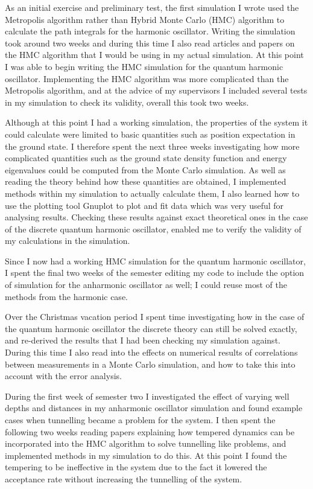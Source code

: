 \documentclass[12pt]{article}
\begin{document}
    As an initial exercise and preliminary test, the first simulation I wrote used the Metropolis algorithm rather than Hybrid Monte Carlo (HMC) algorithm to calculate the path integrals for the harmonic oscillator. Writing the simulation took around two weeks and during this time I also read articles and papers on the HMC algorithm that I would be using in my actual simulation. At this point I was able to begin writing the HMC simulation for the quantum harmonic oscillator. Implementing the HMC algorithm was more complicated than the Metropolis algorithm, and at the advice of my supervisors I included several tests in my simulation to check its validity, overall this took two weeks. 

    Although at this point I had a working simulation, the properties of the system it could calculate were limited to basic quantities such as position expectation in the ground state. I therefore spent the next three weeks investigating how more complicated quantities such as the ground state density function and energy eigenvalues could be computed from the Monte Carlo simulation. As well as reading the theory behind how these quantities are obtained, I implemented methods within my simulation to actually calculate them, I also learned how to use the plotting tool Gnuplot to plot and fit data which was very useful for analysing results. Checking these results against exact theoretical ones in the case of the discrete quantum harmonic oscillator, enabled me to verify the validity of my calculations in the simulation. 

    Since I now had a working HMC simulation for the quantum harmonic oscillator, I spent the final two weeks of the semester editing my code to include the option of simulation for the anharmonic oscillator as well; I could reuse most of the methods from the harmonic case.

    Over the Christmas vacation period I spent time investigating how in the case of the quantum harmonic oscillator the discrete theory can still be solved exactly, and re-derived the results that I had been  checking my simulation against. During this time I also read into the effects on numerical results of correlations between measurements in a Monte Carlo simulation, and how to take this into account with the error analysis.

    During the first week of semester two I investigated the effect of varying well depths and distances in my anharmonic oscillator simulation and found example cases when tunnelling became a problem for the system. I then spent the following two weeks reading papers explaining how tempered dynamics can be incorporated into the HMC algorithm to solve tunnelling like problems, and implemented methods in my simulation to do this. At this point I found the tempering to be ineffective in the system due to the fact it lowered the acceptance rate without increasing the tunnelling of the system. 
\end{document}

